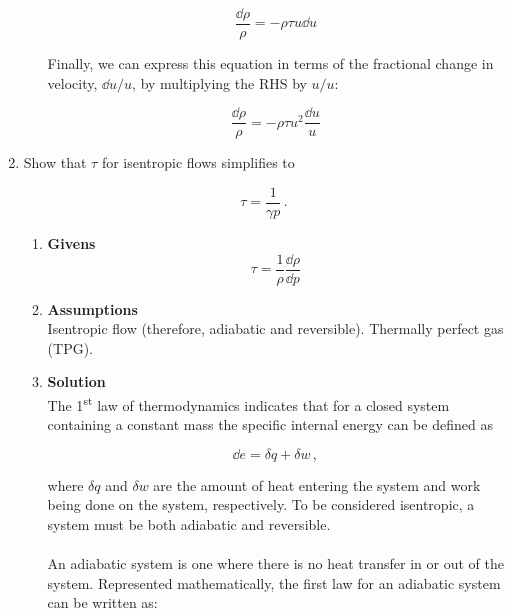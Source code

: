 \documentclass[12pt,letterpaper]{article}
\begin{document}
\begin{enumerate}[label=(\alph*)]
\begin{enumerate}[label=\arabic*.]
			
			
			\begin{equation*}
				\frac{\dd \rho}{\rho} = - \rho \tau u \dd u
			\end{equation*}
			
			Finally, we can express this equation in terms of the fractional change in velocity, $\dd u / u$, by multiplying the RHS by $u / u$:
			
			\begin{equation*}
					\boxed{\frac{\dd \rho}{\rho} = - \rho \tau u^2 \frac{\dd u}{u}}
			\end{equation*} 

		\end{enumerate}
		
		\item Show that $\tau$ for isentropic flows simplifies to
		
			\begin{equation*}
				\tau = \frac{1}{\gamma p} \,.
			\end{equation*}
	
			\begin{enumerate}[label=\arabic*.]
	
				\item{\textbf{Givens}} \\
					\begin{equation*}
						\tau = \frac{1}{\rho} \frac{\dd \rho}{\dd p}
					\end{equation*}


				\item{\textbf{Assumptions}} \\
					Isentropic flow (therefore, adiabatic and reversible). Thermally perfect gas (TPG).


				\item{\textbf{Solution}} \\
					The 1\textsuperscript{st} law of thermodynamics indicates that for a closed system containing a constant mass the specific internal energy can be defined as
					
					\begin{equation*}
						\dd e = \delta q + \delta w\,,
					\end{equation*}

					where $\delta q$ and $\delta w$ are the amount of heat entering the system and work being done on the system, respectively. To be considered isentropic, a system must be both adiabatic and reversible.\\
					\medskip
					\\
					An adiabatic system is one where there is no heat transfer in or out of the system. Represented mathematically, the first law for an adiabatic system can be written as:


\end{enumerate}
\end{enumerate}
\end{document}
